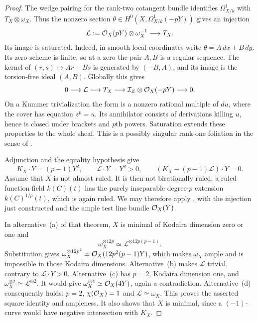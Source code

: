 \begin{proof}
The wedge pairing for the rank-two cotangent bundle identifies
$\Omega^1_{X/k}$ with $T_X\otimes\omega_X$. Thus the nonzero
section $\theta\in H^0(X,\Omega^1_{X/k}(-pY))$ gives an injection
\[
 \mathcal L:=\mathcal O_X(pY)\otimes\omega_X^{-1}\longrightarrow T_X.
\]
Its image is saturated. Indeed, in smooth local coordinates write
$\theta=A\,dx+B\,dy$. Its zero scheme is finite, so at a zero the
pair $A,B$ is a regular sequence. The kernel of
$(r,s)\mapsto Ar+Bs$ is generated by $(-B,A)$, and its image is
the torsion-free ideal $(A,B)$. Globally this gives
\[
 0\longrightarrow\mathcal L\longrightarrow T_X
 \longrightarrow\mathcal I_Z\otimes\mathcal O_X(-pY)
 \longrightarrow0.
\]
On a Kummer trivialization the form is a nonzero rational multiple
of $du$, where the cover has equation $z^p=u$. Its annihilator
consists of derivations killing $u$, hence is closed under brackets
and $p$th powers. Saturation extends these properties to the whole
sheaf. This is a possibly singular rank-one foliation in the sense
of \cite[pp.~104--105]{EkedahlCanonical}.

Adjunction and the equality hypothesis give
\[
 K_X\cdot Y=(p-1)Y^2,\qquad
 \mathcal L\cdot Y=Y^2>0,
 \qquad (K_X-(p-1)\mathcal L)\cdot Y=0.
\]
Assume that $X$ is not almost ruled. It is then not birationally
ruled: a ruled function field $k(C)(t)$ has the purely inseparable
degree-$p$ extension $k(C)^{1/p}(t)$, which is again ruled.
We may therefore apply
\cite[I, Theorem~2.4(ii), pp.~109--115]{EkedahlCanonical}, with
the injection just constructed and the ample test line bundle
$\mathcal O_X(Y)$.

In alternative~(a) of that theorem, $X$ is minimal of Kodaira
dimension zero or one and
\[
 \omega_X^{\otimes12p}\simeq
 \mathcal L^{\otimes12p(p-1)}.
\]
Substitution gives
$\omega_X^{\otimes12p^2}\simeq
\mathcal O_X(12p^2(p-1)Y)$, which makes $\omega_X$ ample and is
impossible in those Kodaira dimensions. Alternative~(b) makes
$\mathcal L$ trivial, contrary to $\mathcal L\cdot Y>0$.
Alternative~(c) has $p=2$, Kodaira dimension one, and
$\omega_X^{\otimes2}\simeq\mathcal L^{\otimes2}$.
It would give $\omega_X^{\otimes4}\simeq\mathcal O_X(4Y)$,
again a contradiction. Alternative~(d) consequently holds:
$p=2$, $\chi(\mathcal O_X)=1$ and $\mathcal L\simeq\omega_X$.
This proves the asserted square identity and ampleness. It also
shows that $X$ is minimal, since a $(-1)$-curve would have negative
intersection with $K_X$.


\end{proof}
